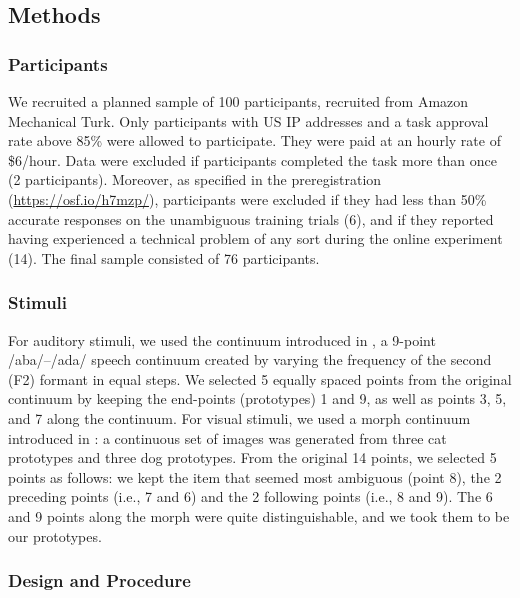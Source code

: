 \documentclass[10pt,letterpaper]{article}
\begin{document}
\subsection{Methods}

\subsubsection{Participants}

We recruited a planned sample of 100 participants, recruited from Amazon Mechanical Turk. Only participants with US IP addresses and a task approval rate above 85\% were allowed to participate. They were paid at an hourly rate of \$6/hour. Data were excluded if participants completed the task more than
once (2 participants). Moreover, as specified in the preregistration (\url{https://osf.io/h7mzp/}), participants were excluded if they had less than 50\% accurate responses on the unambiguous training trials (6), and if they reported having experienced a technical problem of any sort during the online experiment (14). The final sample consisted of 76 participants.

\subsubsection{Stimuli}

For  auditory stimuli, we used the continuum introduced in , a 9-point /aba/--/ada/ speech continuum created by varying the frequency of the second (F2) formant in equal steps. We selected 5 equally spaced points from the original continuum by keeping the end-points (prototypes) 1 and 9, as well as points 3, 5, and 7 along the continuum. For visual stimuli, we used a morph continuum introduced in : a continuous set of images was generated from three cat prototypes and three dog prototypes. From the original 14 points, we selected 5 points as follows: we kept the item that seemed most ambiguous (point 8), the 2 preceding points (i.e., 7 and 6) and the 2 following points (i.e., 8 and 9). The 6 and 9 points along the morph were quite distinguishable, and we took them to be our prototypes.

%

\subsubsection{Design and Procedure}
\end{document}
